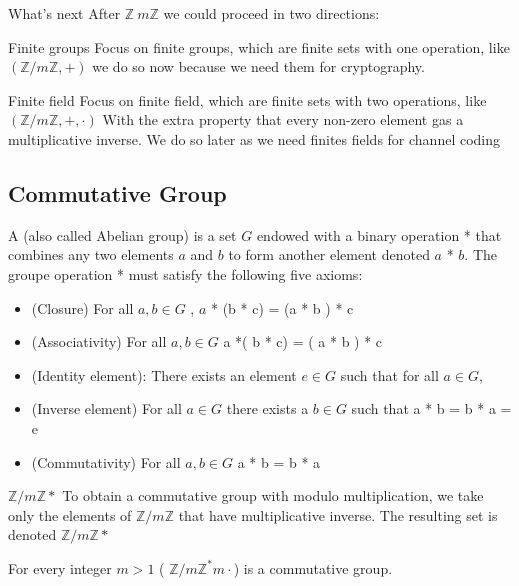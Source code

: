 \begin{parag}{What's next}
    After $\mathbb{Z} \ m \mathbb{Z}$ we could proceed in two directions:
    \begin{subparag}{Finite groups}
        Focus on finite groups, which are finite sets with one operation, like $\left( \mathbb{Z}/ m \mathbb{Z}, +\right)$ we do so now because we need them for cryptography.
    \end{subparag}
    
    \begin{subparag}{Finite field}
        Focus on finite field, which are finite sets with two operations, like $\left( \mathbb{Z}/ m \mathbb{Z}, +, \cdot\right)$ With the extra property that every non-zero element gas a multiplicative inverse. We do so later as we need finites fields for channel coding
    \end{subparag}
\end{parag}
\subsection{Commutative Group}
\begin{definition}
A  (also called Abelian group) is a set $G$ endowed with a binary operation * that combines any two elements $a$ and $b$ to form another element denoted $a$ * $b$. The groupe operation * must satisfy the following five axioms:
\begin{itemize}
    \item (Closure) For all $a, b \in G$ , $a$ * (b * c) = (a * b ) * c
    \item (Associativity) For all $a, b \in G$ a *( b * c) = ( a * b ) * c
    \item (Identity element): There exists an element $e \in G$ such that for all $a \in G$, 
    \item (Inverse element) For all $a \in G$ there exists a $b \in G$ such that a * b = b * a = e
    \item (Commutativity) For all  $a, b \in G$ a * b = b * a
\end{itemize}

\end{definition}


\begin{parag}{ $\mathbb{Z}/ m \mathbb{Z}*$}
    To obtain a commutative group with modulo multiplication, we take only the elements of $ \mathbb{Z}/ m \mathbb{Z}$ that have multiplicative inverse. The resulting set is denoted $\mathbb{Z}/ m \mathbb{Z}*$
    \begin{theorem}
    For every integer $m > 1$ ( $ \mathbb{Z}/ m \mathbb{Z}^*m \cdot$) is a commutative group.
    \end{theorem}
    
\end{parag}
